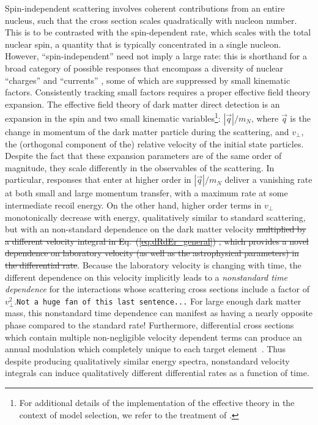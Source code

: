 \documentclass[11pt]{article}
\newcommand{\Eq}[1]{Eq.~(\ref{#1})} \newcommand{\Eqs}[2]{Eqs.~(\ref{#1}) and (\ref{#2})} \newcommand{\Eqm}[2]{Eqs.~(\ref{#1}) through (\ref{#2})}
\newcommand{\sjwColor}{red}
\newcommand{\sjw}[1]{{\color{\sjwColor} #1}}
\newcommand{\sjwrm}[1]{{\color{\sjwColor}\protect\sout{#1}}}
\newcommand{\sjwtt}[1]{{\color{\sjwColor}\tt #1}}
\begin{document}
Spin-independent scattering involves coherent contributions from an entire nucleus, such that the cross section scales quadratically with nucleon number. This is to be contrasted with the spin-dependent rate, which scales with the total nuclear spin, a quantity that is typically concentrated in a single nucleon. However, ``spin-independent'' need not imply a large rate: this is shorthand for a broad category of possible responses that encompass a diversity of nuclear ``charges'' and ``currents'' \cite{Fitzpatrick:2012ix}, some of which are suppressed by small kinematic factors. Consistently tracking small factors requires a proper effective field theory expansion. The effective field theory of dark matter direct detection \cite{Fitzpatrick:2012ix, Anand:2013yka} is an expansion in the spin and two small kinematic variables\footnote{For additional details of the implementation of the effective theory in the context of model selection, we refer to the treatment of \cite{Gluscevic:2015sqa}.}: $|\vec q|/m_N$, where $\vec q$ is the change in momentum of the dark matter particle during the scattering, and $v_\perp$, the (orthogonal component of the) relative velocity of the initial state particles. Despite the fact that these expansion parameters are of the same order of magnitude, they scale differently in the observables of the scattering. In particular, responses that enter at higher order in $|\vec q|/m_N$ deliver a vanishing rate at both small and large momentum transfer, with a maximum rate at some intermediate recoil energy. On the other hand, higher order terms in $v_\perp$ monotonically decrease with energy, qualitatively similar to standard scattering, but \sjw{with an non-standard dependence on the dark matter velocity} \sjwrm{multiplied by a different velocity integral in \Eq{eq:dRdEr_general} \cite{Fitzpatrick:2010br}, which provides a novel dependence on laboratory velocity (as well as the astrophysical parameters) in the differential rate}. \sjw{Because the laboratory velocity is changing with time, the different dependence on this velocity implicitly leads to a {\it nonstandard time dependence} for the interactions whose scattering cross sections include a factor of $v_\perp^2$.}\sjwtt{Not a huge fan of this last sentence...} For large enough dark matter mass, this nonstandard time dependence can manifest as having a nearly opposite phase compared to the standard rate! Furthermore, differential cross sections which contain multiple non-negligible velocity dependent terms can produce an annual modulation which completely unique to each target element~\cite{DelNobile:2015tza,DelNobile:2015rmp}. Thus despite producing qualitatively similar energy spectra, nonstandard velocity integrals can induce qualitatively different differential rates as a function of time.
\end{document}
